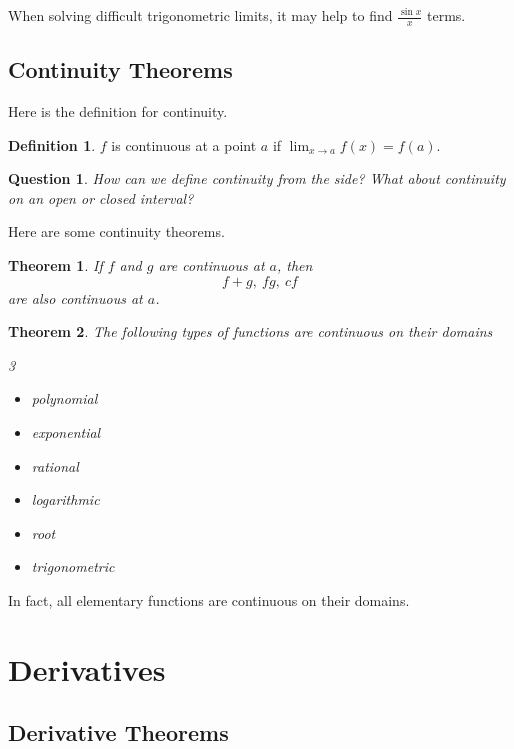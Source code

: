 \documentclass[11pt]{scrartcl}
\theoremstyle{plain}
\newtheorem{theorem}{Theorem}[section]
\newtheorem*{question}{Question}
\theoremstyle{definition}
\newtheorem*{definition}{Definition}
\theoremstyle{remark}
\begin{document}
When solving difficult trigonometric limits, it may help to find $\frac{{\sin x}}{x}$ terms.

\subsection{Continuity Theorems}

Here is the definition for continuity.

\begin{definition}
    $f$ is continuous at a point $a$ if $\lim_{ x \to a }f(x)=f(a)$. 
\end{definition}

\begin{question} 
    How can we define continuity from the side? What about continuity on an open or closed interval?
\end{question}

Here are some continuity theorems.

\begin{theorem}
    If $f$ and $g$ are continuous at $a$, then \[ f+g,\ fg,\ cf \] are also continuous at $a$.
\end{theorem}

\begin{theorem}
    The following types of functions are continuous on their domains 
    \begin{multicols}{3}
        \begin{itemize}
            \item polynomial
            \item exponential
            \item rational
            \item logarithmic
            \item root
            \item trigonometric
        \end{itemize}
    \end{multicols}
\end{theorem}

In fact, all elementary functions are continuous on their domains. 
\newpage

\section{Derivatives}
\subsection{Derivative Theorems}
\end{document}
